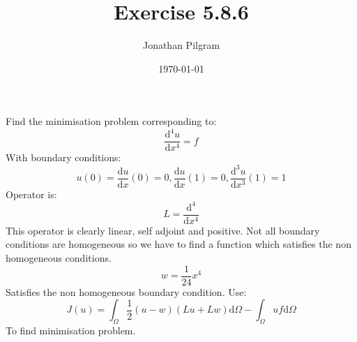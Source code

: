 \documentclass{article}
\title{Exercise 5.8.6}
\author{Jonathan Pilgram}
\date{\today}
\begin{document}
\maketitle
Find the minimisation problem corresponding to: 
\[
\frac{\mathrm{d}^4 u}{\mathrm{d}x^4} = f
\] 
With boundary conditions: 
\[
	u(0) = \frac{\mathrm{d}u}{\mathrm{d}x} (0) = 0, \frac{\mathrm{d}u}{\mathrm{d}x} (1) =0, \frac{\mathrm{d}^3 u}{\mathrm{d}x^3} (1) = 1
\] 
Operator is: 
\[
L = \frac{\mathrm{d}^4}{\mathrm{d}x^4} 
\] 
This operator is clearly linear, self adjoint and positive. Not all boundary conditions are homogeneous so we have to find a function which satisfies the non homogeneous conditions.  
\[
w = \frac{1}{24} x^4 
\] 
Satisfies the non homogeneous boundary condition. Use:
\[
J(u) = \int_{\Omega}^{} \frac{1}{2} (u-w)(Lu+Lw)\mathrm{d}\Omega -  \int_{\Omega}^{}  uf \mathrm{d}\Omega 
\] 
To find minimisation problem.
\end{document}
